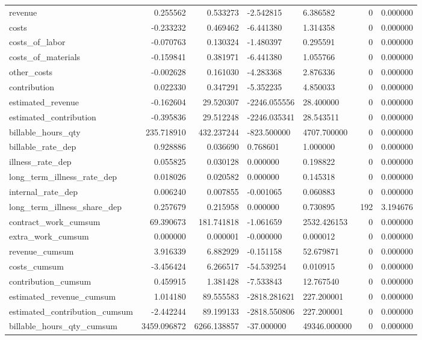\begin{landscape}
\begin{longtable}[h!]{lrrllrr}
revenue & 0.255562 & 0.533273 & -2.542815 & 6.386582 & 0 & 0.000000 \\
costs & -0.233232 & 0.469462 & -6.441380 & 1.314358 & 0 & 0.000000 \\
costs_of_labor & -0.070763 & 0.130324 & -1.480397 & 0.295591 & 0 & 0.000000 \\
costs_of_materials & -0.159841 & 0.381971 & -6.441380 & 1.055766 & 0 & 0.000000 \\
other_costs & -0.002628 & 0.161030 & -4.283368 & 2.876336 & 0 & 0.000000 \\
contribution & 0.022330 & 0.347291 & -5.352235 & 4.850033 & 0 & 0.000000 \\
estimated_revenue & -0.162604 & 29.520307 & -2246.055556 & 28.400000 & 0 & 0.000000 \\
estimated_contribution & -0.395836 & 29.512248 & -2246.035341 & 28.543511 & 0 & 0.000000 \\
billable_hours_qty & 235.718910 & 432.237244 & -823.500000 & 4707.700000 & 0 & 0.000000 \\
billable_rate_dep & 0.928886 & 0.036690 & 0.768601 & 1.000000 & 0 & 0.000000 \\
illness_rate_dep & 0.055825 & 0.030128 & 0.000000 & 0.198822 & 0 & 0.000000 \\
long_term_illness_rate_dep & 0.018026 & 0.020582 & 0.000000 & 0.145318 & 0 & 0.000000 \\
internal_rate_dep & 0.006240 & 0.007855 & -0.001065 & 0.060883 & 0 & 0.000000 \\
long_term_illness_share_dep & 0.257679 & 0.215958 & 0.000000 & 0.730895 & 192 & 3.194676 \\
contract_work_cumsum & 69.390673 & 181.741818 & -1.061659 & 2532.426153 & 0 & 0.000000 \\
extra_work_cumsum & 0.000000 & 0.000001 & -0.000000 & 0.000012 & 0 & 0.000000 \\
revenue_cumsum & 3.916339 & 6.882929 & -0.151158 & 52.679871 & 0 & 0.000000 \\
costs_cumsum & -3.456424 & 6.266517 & -54.539254 & 0.010915 & 0 & 0.000000 \\
contribution_cumsum & 0.459915 & 1.381428 & -7.533843 & 12.767540 & 0 & 0.000000 \\
estimated_revenue_cumsum & 1.014180 & 89.555583 & -2818.281621 & 227.200001 & 0 & 0.000000 \\
estimated_contribution_cumsum & -2.442244 & 89.199133 & -2818.550806 & 227.200001 & 0 & 0.000000 \\
billable_hours_qty_cumsum & 3459.096872 & 6266.138857 & -37.000000 & 49346.000000 & 0 & 0.000000 \\

\end{longtable}
\end{landscape}
